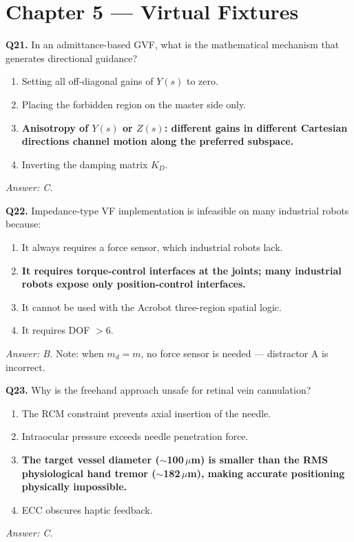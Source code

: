 \documentclass[11pt,a4paper,twoside]{report}
\begin{document}
\section{Chapter 5 — Virtual Fixtures}

\textbf{Q21.} In an admittance-based GVF, what is the mathematical mechanism that generates directional guidance?
\begin{enumerate}[label=\Alph*.]
    \item Setting all off-diagonal gains of $Y(s)$ to zero.
    \item Placing the forbidden region on the master side only.
    \item \textbf{Anisotropy of $Y(s)$ or $Z(s)$: different gains in different Cartesian directions channel motion along the preferred subspace.}
    \item Inverting the damping matrix $K_D$.
\end{enumerate}
\textit{Answer: C.}

\bigskip
\textbf{Q22.} Impedance-type VF implementation is infeasible on many industrial robots because:
\begin{enumerate}[label=\Alph*.]
    \item It always requires a force sensor, which industrial robots lack.
    \item \textbf{It requires torque-control interfaces at the joints; many industrial robots expose only position-control interfaces.}
    \item It cannot be used with the Acrobot three-region spatial logic.
    \item It requires DOF $> 6$.
\end{enumerate}
\textit{Answer: B.} Note: when $m_d = m$, no force sensor is needed — distractor A is incorrect.

\bigskip
\textbf{Q23.} Why is the freehand approach unsafe for retinal vein cannulation?
\begin{enumerate}[label=\Alph*.]
    \item The RCM constraint prevents axial insertion of the needle.
    \item Intraocular pressure exceeds needle penetration force.
    \item \textbf{The target vessel diameter ($\sim$100\,$\mu$m) is smaller than the RMS physiological hand tremor ($\sim$182\,$\mu$m), making accurate positioning physically impossible.}
    \item ECC obscures haptic feedback.
\end{enumerate}
\textit{Answer: C.}
\end{document}
